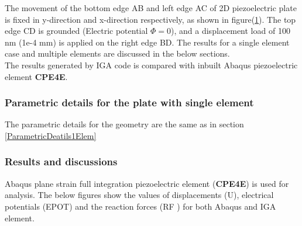 \documentclass[11pt]{article}
\begin{document}
\begin{figure}[H]
\begin{minipage}{.5\textwidth}
		\label{EMLoading}
	\end{minipage}
\end{figure}
The movement of the bottom edge AB and left edge AC of 2D piezoelectric plate is fixed in y-direction and x-direction respectively, as shown in figure(\ref{EMLoading}).
The top edge CD is grounded (Electric potential $\Phi = 0$), and a displacement load of 100 nm (1e-4 mm) is applied on the right edge BD. The results for a single element case and multiple elements are discussed in the below
sections. \\
The results generated by IGA code is compared with inbuilt Abaqus piezoelectric
element \textbf{CPE4E}.

\subsubsection{Parametric details for the plate with single element}


The parametric details for the geometry are the same as in section \hyperref[ParametricDeatils1Elem]{\ref{ParametricDeatils1Elem}}

\subsubsection{Results and discussions}
Abaqus plane strain full integration piezoelectric element (\textbf{CPE4E}) is used for analysis. The below figures show the values of displacements (U), electrical potentials (EPOT) and the reaction forces (RF ) for both Abaqus and IGA element.\\
\end{document}

